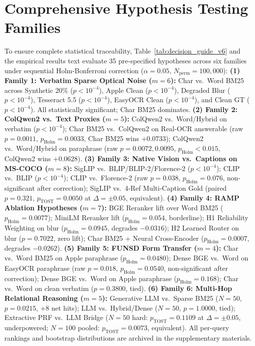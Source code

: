 \section{Comprehensive Hypothesis Testing Families}
\label{sec:appendix_holm}
To ensure complete statistical traceability, Table~\ref{tab:decision_guide_v6} and the empirical results text evaluate 35 pre-specified hypotheses across six families under sequential Holm-Bonferroni correction ($\alpha=0.05$, $N_{\text{perm}}=100{,}000$):
\textbf{(1) Family 1: Verbatim Sparse Optical Noise ($m=6$):} Char vs.\ Word BM25 across Synthetic 20\% ($p < 10^{-4}$), Apple Clean ($p < 10^{-4}$), Degraded Blur ($p < 10^{-4}$), Tesseract 5.5 ($p < 10^{-4}$), EasyOCR Clean ($p < 10^{-4}$), and Clean GT ($p < 10^{-4}$). All statistically significant; Char BM25 dominates.
\textbf{(2) Family 2: ColQwen2 vs.\ Text Proxies ($m=5$):} ColQwen2 vs.\ Word/Hybrid on verbatim ($p < 10^{-4}$); Char BM25 vs.\ ColQwen2 on Real-OCR answerable (raw $p=0.0011$, $p_{\text{Holm}}=0.0033$, Char BM25 wins $+0.0733$); ColQwen2 vs.\ Word/Hybrid on paraphrase (raw $p=0.0072, 0.0095$, $p_{\text{Holm}} < 0.015$, ColQwen2 wins $+0.0628$).
\textbf{(3) Family 3: Native Vision vs.\ Captions on MS-COCO ($m=8$):} SigLIP vs.\ BLIP/BLIP-2/Florence-2 ($p < 10^{-4}$); CLIP vs.\ BLIP ($p < 10^{-4}$); CLIP vs.\ Florence-2 (raw $p=0.038$, $p_{\text{Holm}}=0.076$, non-significant after correction); SigLIP vs.\ 4-Ref Multi-Caption Gold (paired $p=0.321$, $p_{\text{TOST}}=0.0050$ at $\Delta=\pm 0.05$, equivalent).
\textbf{(4) Family 4: RAMP Ablation Hypotheses ($m=7$):} BGE Reranker lift over Word BM25 ($p_{\text{Holm}}=0.0077$); MiniLM Reranker lift ($p_{\text{Holm}}=0.054$, borderline); H1 Reliability Weighting on blur ($p_{\text{Holm}}=0.0945$, degrades $-0.0316$); H2 Learned Router on blur ($p=0.7022$, zero lift); Char BM25 + Neural Cross-Encoder ($p_{\text{Holm}}=0.0007$, degrades $-0.0262$).
\textbf{(5) Family 5: FUNSD Form Transfer ($m=4$):} Char vs.\ Word BM25 on Apple paraphrase ($p_{\text{Holm}}=0.0480$); Dense BGE vs.\ Word on EasyOCR paraphrase (raw $p=0.018$, $p_{\text{Holm}}=0.0540$, non-significant after correction); Dense BGE vs.\ Word on Apple paraphrase ($p_{\text{Holm}}=0.168$); Char vs.\ Word on clean verbatim ($p=0.3800$, tied).
\textbf{(6) Family 6: Multi-Hop Relational Reasoning ($m=5$):} Generative LLM vs.\ Sparse BM25 ($N=50$, $p=0.0215$, $+8$ net hits); LLM vs.\ Hybrid/Dense ($N=50$, $p=1.0000$, tied); Extractive PRF vs.\ LLM Bridge ($N=50$ hard: $p_{\text{TOST}}=0.1109$ at $\Delta=\pm 0.05$, underpowered; $N=100$ pooled: $p_{\text{TOST}}=0.0073$, equivalent). All per-query rankings and bootstrap distributions are archived in the supplementary materials.


